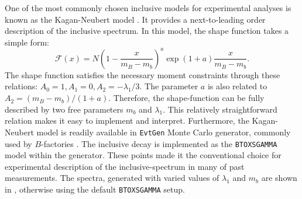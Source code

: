 One of the most commonly chosen inclusive \BtoXsgamma models for experimental analyses is known as the Kagan-Neubert model \cite{Kagan:1998ym}.
It provides a next-to-leading order description of the inclusive \BtoXsgamma spectrum. 
In this model, the shape function takes a simple form:
\begin{equation}
    \mathcal{F}(x) = N\left(1-\frac{x}{m_B-m_b}\right)^a\exp{(1+a)\frac{x}{m_B-m_b}}.
\end{equation}
The shape function satisfies the necessary moment constraints through these relations: $A_0=1,A_1 = 0,A_2=-\lambda_1/3$.
The parameter $a$ is also related to $A_2=(m_B-m_b)/(1+a)$.
Therefore, the shape-function can be fully described by two free parameters $m_b$ and $\lambda_1$.
This relatively straightforward relation makes it easy to implement and interpret.
Furthermore, the Kagan-Neubert model is readily available in \texttt{EvtGen} Monte Carlo generator, commonly used by $B$-factories \cite{Ryd:2005zz}.
The \BtoXsgamma inclusive decay is implemented as the \texttt{BTOXSGAMMA} model within the generator. 
These points made it the conventional choice for experimental description of the inclusive-\Egamma spectrum in many of past measurements.
The spectra, generated with varied values of $\lambda_1$ and $m_b$ are shown in , otherwise using the default \texttt{BTOXSGAMMA} setup.
